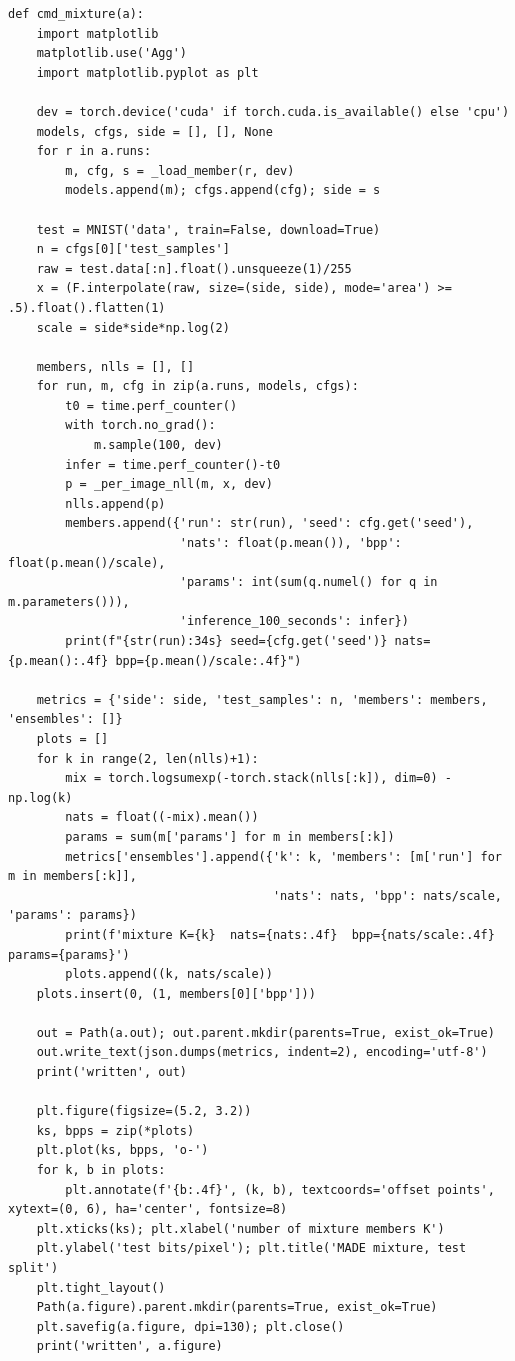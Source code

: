 \begin{lstlisting}
def cmd_mixture(a):
    import matplotlib
    matplotlib.use('Agg')
    import matplotlib.pyplot as plt

    dev = torch.device('cuda' if torch.cuda.is_available() else 'cpu')
    models, cfgs, side = [], [], None
    for r in a.runs:
        m, cfg, s = _load_member(r, dev)
        models.append(m); cfgs.append(cfg); side = s

    test = MNIST('data', train=False, download=True)
    n = cfgs[0]['test_samples']
    raw = test.data[:n].float().unsqueeze(1)/255
    x = (F.interpolate(raw, size=(side, side), mode='area') >= .5).float().flatten(1)
    scale = side*side*np.log(2)

    members, nlls = [], []
    for run, m, cfg in zip(a.runs, models, cfgs):
        t0 = time.perf_counter()
        with torch.no_grad():
            m.sample(100, dev)
        infer = time.perf_counter()-t0
        p = _per_image_nll(m, x, dev)
        nlls.append(p)
        members.append({'run': str(run), 'seed': cfg.get('seed'),
                        'nats': float(p.mean()), 'bpp': float(p.mean()/scale),
                        'params': int(sum(q.numel() for q in m.parameters())),
                        'inference_100_seconds': infer})
        print(f"{str(run):34s} seed={cfg.get('seed')} nats={p.mean():.4f} bpp={p.mean()/scale:.4f}")

    metrics = {'side': side, 'test_samples': n, 'members': members, 'ensembles': []}
    plots = []
    for k in range(2, len(nlls)+1):
        mix = torch.logsumexp(-torch.stack(nlls[:k]), dim=0) - np.log(k)
        nats = float((-mix).mean())
        params = sum(m['params'] for m in members[:k])
        metrics['ensembles'].append({'k': k, 'members': [m['run'] for m in members[:k]],
                                     'nats': nats, 'bpp': nats/scale, 'params': params})
        print(f'mixture K={k}  nats={nats:.4f}  bpp={nats/scale:.4f}  params={params}')
        plots.append((k, nats/scale))
    plots.insert(0, (1, members[0]['bpp']))

    out = Path(a.out); out.parent.mkdir(parents=True, exist_ok=True)
    out.write_text(json.dumps(metrics, indent=2), encoding='utf-8')
    print('written', out)

    plt.figure(figsize=(5.2, 3.2))
    ks, bpps = zip(*plots)
    plt.plot(ks, bpps, 'o-')
    for k, b in plots:
        plt.annotate(f'{b:.4f}', (k, b), textcoords='offset points', xytext=(0, 6), ha='center', fontsize=8)
    plt.xticks(ks); plt.xlabel('number of mixture members K')
    plt.ylabel('test bits/pixel'); plt.title('MADE mixture, test split')
    plt.tight_layout()
    Path(a.figure).parent.mkdir(parents=True, exist_ok=True)
    plt.savefig(a.figure, dpi=130); plt.close()
    print('written', a.figure)



\end{lstlisting}
